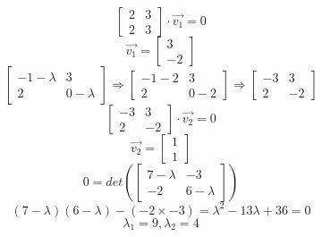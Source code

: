 \documentclass[11pt]{article}
\newenvironment{problem}[2][Problem]{\begin{trivlist}
\item[\hskip \labelsep {\bfseries #1}\hskip \labelsep {\bfseries #2.}]}{\end{trivlist}}
\begin{document}
\begin{problem}{9}
\begin{enumerate}
\begin{equation}
		\end{equation}
		\begin{equation}
			\begin{bmatrix} 2 & 3 \\ 2 & 3 \end{bmatrix} \cdot \vec{v_1} = 0
		\end{equation}
		\begin{equation}
			\vec{v_1} = \begin{bmatrix}
				3 \\ -2
			\end{bmatrix}
		\end{equation}
		\begin{equation}
			\begin{bmatrix} -1-\lambda & 3 \\ 2 & 0-\lambda \end{bmatrix} \Rightarrow \begin{bmatrix} -1-2 & 3 \\ 2 & 0-2 \end{bmatrix} \Rightarrow \begin{bmatrix} -3 & 3 \\ 2 & -2 \end{bmatrix}
		\end{equation}
		\begin{equation}
			\begin{bmatrix} -3 & 3 \\ 2 & -2 \end{bmatrix} \cdot \vec{v_2} = 0
		\end{equation}
		\begin{equation}
			\vec{v_2} = \begin{bmatrix}
			1 \\ 1
			\end{bmatrix}
		\end{equation}
		\newline
		\begin{equation}
			0 = det\left(\begin{bmatrix} 7-\lambda & -3 \\ -2 & 6-\lambda \end{bmatrix}\right)
		\end{equation}
		\begin{equation}
			(7-\lambda)(6-\lambda) - (-2 \times -3) = \lambda^2 - 13\lambda +36 = 0
		\end{equation}
		\begin{equation}
			\lambda_1 = 9, \lambda_2 = 4
		\end{equation}

\end{enumerate}
\end{problem}
\end{document}
